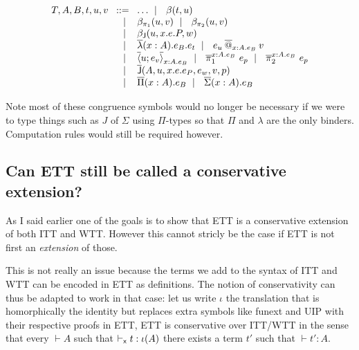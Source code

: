 \[
  \begin{array}{l@{~\,}r@{~\,}l}
    T,A,B,t,u,v &\bnf& \dots \bnfor \beta(t,u) \\
    &\bnfor& \redpio(u,v) \bnfor \redpit(u,v) \\
    &\bnfor& \redJ(u,x.e.P,w) \\
    &\bnfor& \lamb{x:A}{e_B} e_t
    \bnfor \appb{e_u}{x:A}{e_B}{v} \\
    &\bnfor& \pairb{x:A}{e_B}{u}{e_v}
    \bnfor \piob{x:A}{e_B}{e_p} \bnfor \pitb{x:A}{e_B}{e_p} \\
    &\bnfor& \Jb(A,u,x.e.e_P,e_w,v,p) \\
    &\bnfor& \pib (x:A). e_B \bnfor \sumb (x:A). e_B
  \end{array}
\]

Note most of these congruence symbols would no longer be necessary if we were to
type things such as \(J\) of \(\Sigma\) using \(\Pi\)-types so that \(\Pi\)
and \(\lambda\) are the only binders. Computation rules would still be required
however.

\subsection{Can \acrshort{ETT} still be called a conservative extension?}

As I said earlier one of the goals is to show that \acrshort{ETT} is a
conservative extension of both \acrshort{ITT} and \acrshort{WTT}. However this
cannot stricly be the case if \acrshort{ETT} is not first an \emph{extension}
of those.

This is not really an issue because the terms we add to the syntax of
\acrshort{ITT} and \acrshort{WTT} can be encoded in \acrshort{ETT} as
definitions. The notion of conservativity can thus be adapted to work in that
case: let us write \(\iota\) the translation that is homorphically the identity
but replaces extra symbols like \acrshort{funext} and \acrshort{UIP} with their
respective proofs in \acrshort{ETT}, \acrshort{ETT} is conservative over
\acrshort{ITT}/\acrshort{WTT} in the sense that every \(\vdash A\) such that
\(\vdash_{\mathsf{x}} t : \iota(A)\) there exists a term \(t'\) such that
\(\vdash t' : A\).

